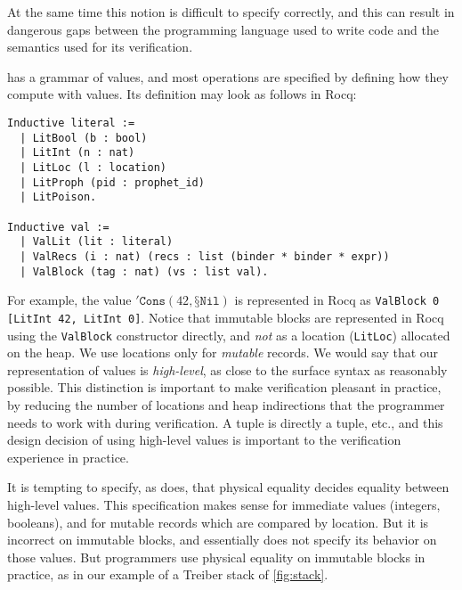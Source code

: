 At the same time this notion is difficult to specify correctly, and this can result in dangerous gaps between the programming language used to write code and the semantics used for its verification.

\ZooLang has a grammar of values, and most operations are specified by defining how they compute with \ZooLang values. Its definition may look as follows in Rocq:
\begin{verbatim}
Inductive literal :=
  | LitBool (b : bool)
  | LitInt (n : nat)
  | LitLoc (l : location)
  | LitProph (pid : prophet_id)
  | LitPoison.

Inductive val :=
  | ValLit (lit : literal)
  | ValRecs (i : nat) (recs : list (binder * binder * expr))
  | ValBlock (tag : nat) (vs : list val).
\end{verbatim}

For example, the value $'\texttt{Cons} (42, \texttt{§}\texttt{Nil})$ is represented in Rocq as \texttt{ValBlock 0 [LitInt 42, LitInt 0]}. Notice that immutable blocks are represented in Rocq using the \texttt{ValBlock} constructor directly, and \emph{not} as a location (\texttt{LitLoc}) allocated on the heap. We use locations only for \emph{mutable} records. We would say that our representation of \ZooLang values is \emph{high-level}, as close to the surface syntax as reasonably possible. This distinction is important to make verification pleasant in practice, by reducing the number of locations and heap indirections that the programmer needs to work with during verification. A \ZooLang tuple is directly a tuple, etc., and this design decision of using high-level values is important to the verification experience in practice.

It is tempting to specify, as \HeapLang does, that physical equality decides equality between high-level values. This specification makes sense for immediate values (integers, booleans), and for mutable records which are compared by location. But it is incorrect on immutable blocks, and \HeapLang essentially does not specify its behavior on those values. But programmers use physical equality on immutable blocks in practice, as in our example of a Treiber stack of \cref{fig:stack}.

